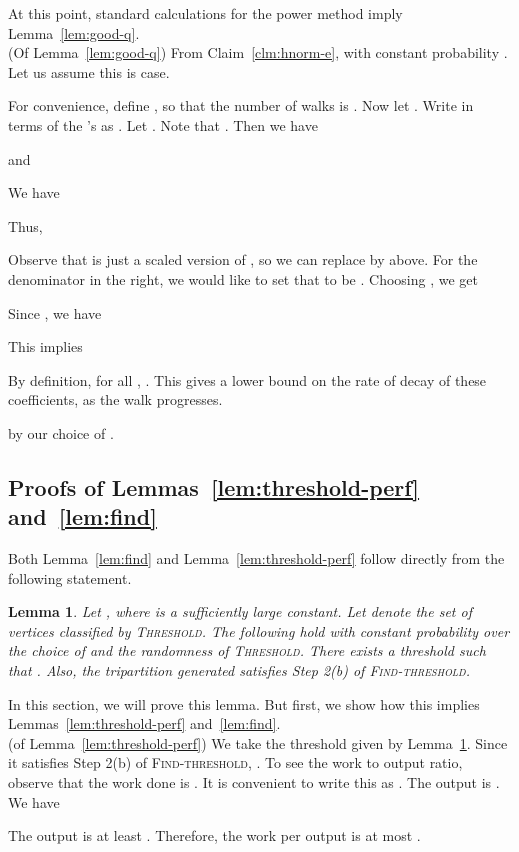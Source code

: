 \documentclass[11pt]{article}
\newtheorem{Lem}[theorem]{Lemma}
\newenvironment{myproof}{\noindent {\sc Proof:}}{}
\newcommand\Threshold{\textsc{Threshold}\xspace}
\newcommand\Find{\textsc{Find-threshold}\xspace}
\begin{document}
At this point, standard calculations for the power method imply Lemma~\ref{lem:good-q}. \\

\begin{myproof}(Of Lemma~\ref{lem:good-q})
From Claim~\ref{clm:hnorm-e}, with constant probability . Let us assume this is case.

For convenience, define , so that the number of walks is .  Now let .
Write  in terms of the 's as
. Let . Note that . Then we have

and

We have

Thus,

Observe that  is just a scaled version of , so we
can replace  by  above. For the denominator in the right,
we would like to set that to be . Choosing
, we get



Since , we have


This implies


By definition, for all , .
This gives a lower bound on the rate of decay of these coefficients,
as the walk progresses.

by our choice of .
\end{myproof}


\subsection{Proofs of Lemmas~\ref{lem:threshold-perf} and~\ref{lem:find}} \label{sec:thresh}

Both Lemma~\ref{lem:find} and
Lemma~\ref{lem:threshold-perf} follow directly
from the following statement.

\begin{Lem} \label{lem:good-thresh} Let , where
 is a sufficiently large constant. Let  denote the set of vertices
classified by \Threshold.
The following hold with constant probability
over the choice of  and the randomness of {\Threshold}.
There exists a threshold  such
that .
Also, the tripartition generated satisfies Step 2(b) of {\Find}.
\end{Lem}

In this section, we will prove this lemma. But first,
we show how this implies Lemmas~\ref{lem:threshold-perf}
and~\ref{lem:find}.\\

\begin{myproof} (of Lemma~\ref{lem:threshold-perf}) We take
the threshold  given by Lemma~\ref{lem:good-thresh}.
Since it satisfies Step 2(b) of {\Find},
. To see the work
to output ratio, observe that the work done is . It is convenient
to write this as .
The output is . We have

The output is at least . Therefore, the work per
output is at most .
\end{myproof}\\
\end{document}
